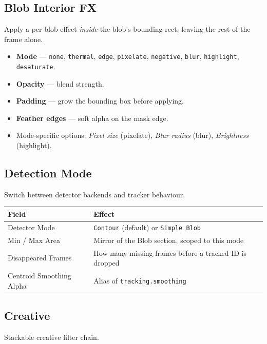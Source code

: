 \documentclass[11pt,a4paper,openany]{report}
\begin{document}
\subsection{Blob Interior FX}
Apply a per-blob effect \emph{inside} the blob's bounding rect, leaving the
rest of the frame alone.

\begin{itemize}
    \item \textbf{Mode} --- \texttt{none}, \texttt{thermal}, \texttt{edge},
        \texttt{pixelate}, \texttt{negative}, \texttt{blur},
        \texttt{highlight}, \texttt{desaturate}.
    \item \textbf{Opacity} --- blend strength.
    \item \textbf{Padding} --- grow the bounding box before applying.
    \item \textbf{Feather edges} --- soft alpha on the mask edge.
    \item Mode-specific options: \emph{Pixel size} (pixelate), \emph{Blur
        radius} (blur), \emph{Brightness} (highlight).
\end{itemize}

\subsection{Detection Mode}
Switch between detector backends and tracker behaviour.

\begin{tabularx}{\linewidth}{@{}lX@{}}
    \toprule
    \textbf{Field} & \textbf{Effect} \\
    \midrule
    Detector Mode      & \texttt{Contour} (default) or \texttt{Simple Blob} \\
    Min / Max Area     & Mirror of the Blob section, scoped to this mode \\
    Disappeared Frames & How many missing frames before a tracked ID is dropped \\
    Centroid Smoothing Alpha & Alias of \texttt{tracking.smoothing} \\
    \bottomrule
\end{tabularx}

\subsection{Creative}
Stackable creative filter chain.
\end{document}
